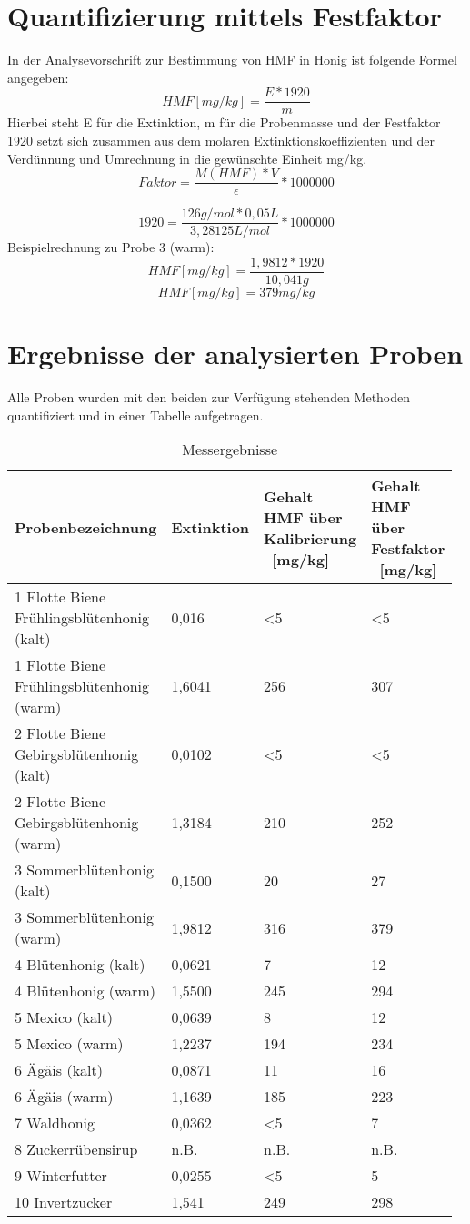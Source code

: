 	
\section{Quantifizierung mittels Festfaktor}
In der Analysevorschrift zur Bestimmung von HMF in Honig ist folgende Formel angegeben:
	\[HMF[mg/kg]=\frac{ E * 1920 }{ m }\]
Hierbei steht E für die Extinktion, m für die Probenmasse und der Festfaktor 1920 setzt sich zusammen aus dem molaren Extinktionskoeffizienten und der Verdünnung und Umrechnung in die gewünschte Einheit mg/kg.
	\[Faktor=\frac{ M(HMF)*V }{ \epsilon }*1000000\]
	
	\[1920=\frac{ 126g/mol * 0,05L }{ 3,28125L/mol }*1000000\]
Beispielrechnung zu Probe 3 (warm):
	\[HMF[mg/kg]=\frac{ 1,9812 * 1920 }{ 10,041g }\]
	\[HMF[mg/kg]=379mg/kg\]
\section{Ergebnisse der analysierten Proben}
Alle Proben wurden mit den beiden zur Verfügung stehenden Methoden quantifiziert und in einer Tabelle aufgetragen.

\begin{table}[htbp]
	\centering
		\begin{tabular}{p{0.30\linewidth}|p{0.17\linewidth}|p{0.25\linewidth}|p{0.25\linewidth}} 
			Probenbezeichnung & Extinktion & Gehalt HMF über Kalibrierung \ [mg/kg] &  Gehalt HMF über Festfaktor \ [mg/kg]\\
			\hline
			1 Flotte Biene Frühlingsblütenhonig (kalt) & 0,016 & <5 & <5\\
			\hline
			1 Flotte Biene Frühlingsblütenhonig (warm) & 1,6041 & 256 & 307\\
			\hline
			2 Flotte Biene Gebirgsblütenhonig (kalt) & 0,0102 & <5 & <5\\
			\hline
			2 Flotte Biene Gebirgsblütenhonig (warm) & 1,3184 & 210 & 252\\
			\hline
			3 Sommerblütenhonig (kalt) & 0,1500 & 20 & 27\\
			\hline
			3 Sommerblütenhonig (warm) & 1,9812 & 316 & 379\\
			\hline
			4 Blütenhonig (kalt) & 0,0621 & 7 & 12\\
			\hline
			4 Blütenhonig (warm) & 1,5500 & 245 & 294\\
			\hline
			5 Mexico (kalt) & 0,0639 & 8 & 12\\
			\hline
			5 Mexico (warm) & 1,2237 & 194 & 234\\
			\hline
			6 Ägäis (kalt) & 0,0871 & 11 & 16\\
			\hline
			6 Ägäis (warm) & 1,1639 & 185 & 223\\
			\hline
			7 Waldhonig & 0,0362 & <5 & 7\\
			\hline
			8 Zuckerrübensirup & n.B. & n.B. & n.B.\\
			\hline
			9 Winterfutter & 0,0255 & <5 & 5\\
			\hline
			10 Invertzucker & 1,541 & 249 & 298\\

		\end{tabular}
	\caption{Messergebnisse}
	\label{tab:Messergebnisse}
\end{table}

